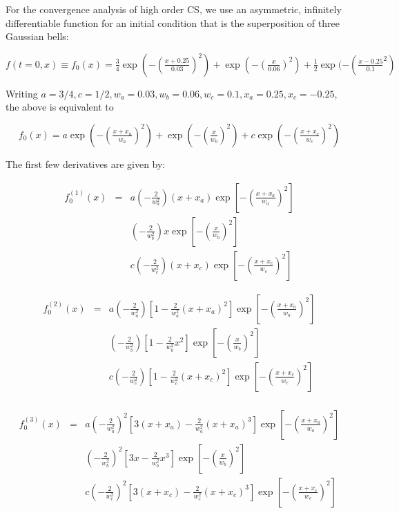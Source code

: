 \documentclass[11pt]{article}
\begin{document}
For the convergence analysis of high order CS, we use an asymmetric, infinitely differentiable function for an initial condition that is the superposition of three Gaussian bells:

$$f(t = 0, x) \equiv f_0(x) = \tfrac{3}{4} \exp(-\left(\tfrac{x + 0.25}{0.03}\right)^2) + \exp(-\left(\tfrac{x}{0.06}\right)^2) + \tfrac{1}{2}\exp(-(\tfrac{x - 0.25}{0.1}^2)$$ 

Writing $a = 3/4, c = 1/2, w_a = 0.03, w_b = 0.06, w_c = 0.1, x_a = 0.25, x_c = -0.25$, the above is equivalent to

$$f_0(x) = a\exp(-\left(\tfrac{x + x_a}{w_a}\right)^2) + \exp(-\left(\tfrac{x}{w_b}\right)^2) + c\exp(-(\tfrac{x + x_c}{w_c})^2)$$ 

The first few derivatives are given by:

\begin{eqnarray*}
f^{(1)}_0(x) & = & a\left(-\frac{2}{w_a^2}\right)(x + x_a)\exp\left[-\left(\frac{x + x_a}{w_a}\right)^2\right] \\[1em]
& & \left(-\frac{2}{w_b^2}\right)x\exp\left[-\left(\frac{x}{w_b}\right)^2\right]\\[1em]
& & c\left(-\frac{2}{w_c^2}\right)(x + x_c)\exp\left[-\left(\frac{x + x_c}{w_c}\right)^2\right]
\end{eqnarray*}

\begin{eqnarray*}
f^{(2)}_0(x) & = & a\left(-\frac{2}{w_a^2}\right)\left[1 - \frac{2}{w_a^2}(x + x_a)^2\right]\exp\left[-\left(\frac{x + x_a}{w_a}\right)^2\right] \\
& & \left(-\frac{2}{w_b^2}\right)\left[1 - \frac{2}{w_b^2}x^2\right]\exp\left[-\left(\frac{x}{w_b}\right)^2\right] \\
& & c\left(-\frac{2}{w_c^2}\right)\left[1 - \frac{2}{w_c^2}(x + x_c)^2\right]\exp\left[-\left(\frac{x + x_c}{w_c}\right)^2\right] \\
\end{eqnarray*}

\begin{eqnarray*}
f^{(3)}_0(x) & = & a\left(-\frac{2}{w_a^2}\right)^2\left[3(x + x_a) - \frac{2}{w_a^2}(x + x_a)^3\right]\exp\left[-\left(\frac{x + x_a}{w_a}\right)^2\right] \\[1em]
& & \left(-\frac{2}{w_b^2}\right)^2\left[3x - \frac{2}{w_b^2}x^3\right]\exp\left[-\left(\frac{x}{w_b}\right)^2\right] \\[1em]
& & c\left(-\frac{2}{w_c^2}\right)^2\left[3(x + x_c) - \frac{2}{w_c^2}(x + x_c)^3\right]\exp\left[-\left(\frac{x + x_c}{w_c}\right)^2\right]
\end{eqnarray*}
\end{document}
